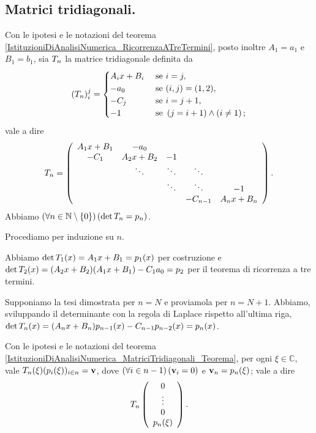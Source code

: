 \subsection{Matrici tridiagonali.}
\label{IstituzioniDiAnalisiNumerica_MatriciTridiagonali}
\begin{Theorem}
	\label{IstituzioniDiAnalisiNumerica_MatriciTridiagonali_Teorema}
	Con le ipotesi e le notazioni del teorema \ref{IstituzioniDiAnalisiNumerica_RicorrenzaATreTermini}, posto inoltre $A_1 = a_1$ e $B_1 = b_1$, sia $T_n$ la matrice tridiagonale definita da
	\[
		(T_n)_i^j =
		\begin{cases}
			A_i x + B_i&\text{ se }i = j,\\
			- a_ 0&\text{ se }(i,j) = (1,2),\\
			- C_j&\text{ se }i = j + 1,\\
			- 1&\text{ se }\left ( j = i + 1 \right ) \wedge \left ( i \neq 1 \right );
		\end{cases}
	\]
	vale a dire
	\[
	T_n =
	\left (
	\begin{array}{ccccc}
		A_1x + B_1	&	-a_0		&		&		&\\
		- C_1		&	A_2x + B_2	&	-1	&		&\\
				&	\ddots		&	\ddots	&	\ddots	&\\
				&			&	\ddots	&	\ddots	&	- 1\\
				&			&	&	-C_{n - 1}	&	A_nx + B_n
	\end{array}
	\right ).
	\]
	Abbiamo $\left ( \forall n \in \mathbb{N} \setminus \lbrace 0 \rbrace \right ) \left ( \operatorname{det} T_n = p_n \right )$.
\end{Theorem}
\Proof Procediamo per induzione su $n$.
\par Abbiamo $\operatorname{det}{T_1}(x) = A_1x + B_1 = p_1(x)$ per costruzione e $\operatorname{det}{T_2}(x) = (A_2x + B_2)(A_1x + B_1) - C_1a_0 = p_2$ per il teorema di ricorrenza a tre termini.
\par Supponiamo la tesi dimostrata per $n = N$ e proviamola per $n = N + 1$. Abbiamo, sviluppando il determinante con la regola di Laplace rispetto all'ultima riga,
$\operatorname{det}{T_n}(x) = (A_nx + B_n) p_{n - 1}(x) - C_{n - 1} p_{n - 2}(x) = p_n(x)$. \EndProof
\begin{Theorem}
	Con le ipotesi e le notazioni del teorema \ref{IstituzioniDiAnalisiNumerica_MatriciTridiagonali_Teorema}, per ogni $\xi \in \mathbb{C}$, vale $T_n(\xi) (p_i(\xi))_{i \in n} = \mathbf{v}$, dove $\left ( \forall i \in n - 1 \right ) \left ( \mathbf{v}_i = 0 \right )$ e $\mathbf{v}_n = p_n(\xi)$; vale a dire
	\[
		T_n \left ( \begin{array}{c} 0\\ \vdots\\ 0\\ p_n(\xi)\end{array} \right ).
	\] 
\end{Theorem}
